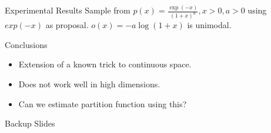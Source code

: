 \begin{frame}{Experimental Results}
  Sample from $p(x)=\frac{\exp(-x)}{(1+x)^a},x>0,a>0$ using $exp(-x)$ as proposal.
  $o(x) = -a\log(1+x)$ is unimodal. 
\end{frame}

\begin{frame}{Conclusions}
  \begin{itemize}
  \item Extension of a known trick to continuous space.
  \item Does not work well in high dimensions.
  \item Can we estimate partition function using this?
  \end{itemize}
\end{frame}

\begin{frame}
  Backup Slides
\end{frame}

